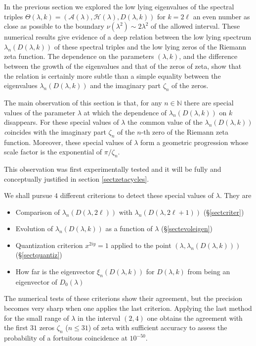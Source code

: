 \documentclass[cupthm]{CUP-JNL-JMJ}
\def\N{{\mathbb N}}
\def\cA{{\mathcal A}}
\def\cH{{\mathcal H}}
\numberwithin{equation}{section}
\theoremstyle{cupplain}
\theoremstyle{cupdefinition}
\theoremstyle{cupremark}
\theoremstyle{cupproof}
\begin{document}
  In the previous section we explored the low lying eigenvalues of the spectral triples $\Theta(\lambda,k)=(\cA(\lambda),\cH(\lambda),D(\lambda,k))$ for $k=2\ell$ an even number as close as possible to the boundary $\nu(\lambda^2)\sim 2 \lambda^2$ of the allowed interval. These numerical results give evidence of a deep relation between the low lying spectrum  $\lambda_n(D(\lambda,k))$ of these spectral triples and the low lying zeros of the Riemann zeta function. The dependence on the parameters $(\lambda,k)$, and the difference between the  growth of the eigenvalues and that of the  zeros of zeta,   show that the relation is certainly  more subtle than a simple equality between the eigenvalues $\lambda_n(D(\lambda,k))$ and the imaginary part $\zeta_n$ of the zeros.   
  
  
  
 The main observation of this section is that, for any $n\in \N$ there are special values of the parameter $\lambda$ at which the dependence of  $\lambda_n(D(\lambda,k))$ on $k$ disappears. For these special values of $\lambda$ the {\emph common value} of the $\lambda_n(D(\lambda,k))$ {\emph coincides} with the imaginary part $\zeta_n$ of the $n$-th zero of the Riemann zeta function. Moreover, these special values of $\lambda$ form a geometric progression whose scale factor is the exponential of $\pi/\zeta_n$.
   
   This observation was first experimentally tested and it will be fully and conceptually justified  in  section \ref{sectzetacycles}.
   
   We shall pursue $4$ different criterions to detect these special values of $\lambda$. They are
   \begin{itemize}
   \item Comparison of $\lambda_n(D(\lambda,2\ell))$ with $\lambda_n(D(\lambda,2\ell+1))$ (\S \ref{sectcriter})
   \item Evolution of $\lambda_n(D(\lambda,k))$ as a function of $\lambda$ (\S \ref{sectevoleigen})
   \item Quantization criterion $x^{2iy}=1$ applied to the point $(\lambda,\lambda_n(D(\lambda,k)))$  (\S \ref{sectquantiz})
   \item How far is the eigenvector $\xi_n(D(\lambda,k))$ for $D(\lambda,k)$  from being an eigenvector of $D_0(\lambda)$   	
   \end{itemize}

   The numerical tests of these criterions show their agreement, but the precision becomes very sharp when one applies the last criterion. Applying the last method for the small range of $\lambda$ in the interval $(2,4)$ one obtains the agreement with the first $31$ zeros $\zeta_n$ ($n\leq 31$) of zeta with  sufficient accuracy to assess the probability of a fortuitous coincidence at $10^{-50}$.
    
\end{document}
